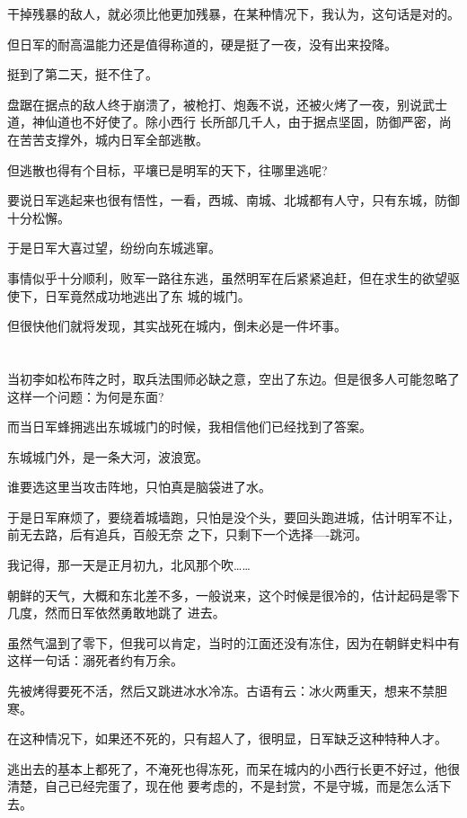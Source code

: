 \documentclass[11pt,a4paper,onecolumn]{article}
\begin{document}
干掉残暴的敌人，就必须比他更加残暴，在某种情况下，我认为，这句话是对的。

但日军的耐高温能力还是值得称道的，硬是挺了一夜，没有出来投降。

挺到了第二天，挺不住了。

盘踞在据点的敌人终于崩溃了，被枪打、炮轰不说，还被火烤了一夜，别说武士道，神仙道也不好使了。除小西行
长所部几千人，由于据点坚固，防御严密，尚在苦苦支撑外，城内日军全部逃散。

但逃散也得有个目标，平壤已是明军的天下，往哪里逃呢?

要说日军逃起来也很有悟性，一看，西城、南城、北城都有人守，只有东城，防御十分松懈。

于是日军大喜过望，纷纷向东城逃窜。

事情似乎十分顺利，败军一路往东逃，虽然明军在后紧紧追赶，但在求生的欲望驱使下，日军竟然成功地逃出了东
城的城门。

但很快他们就将发现，其实战死在城内，倒未必是一件坏事。

\section[\thesection]{}

当初李如松布阵之时，取兵法围师必缺之意，空出了东边。但是很多人可能忽略了这样一个问题：为何是东面?

而当日军蜂拥逃出东城城门的时候，我相信他们已经找到了答案。

东城城门外，是一条大河，波浪宽。

谁要选这里当攻击阵地，只怕真是脑袋进了水。

于是日军麻烦了，要绕着城墙跑，只怕是没个头，要回头跑进城，估计明军不让，前无去路，后有追兵，百般无奈
之下，只剩下一个选择----跳河。

我记得，那一天是正月初九，北风那个吹……

朝鲜的天气，大概和东北差不多，一般说来，这个时候是很冷的，估计起码是零下几度，然而日军依然勇敢地跳了
进去。

虽然气温到了零下，但我可以肯定，当时的江面还没有冻住，因为在朝鲜史料中有这样一句话：溺死者约有万余。

先被烤得要死不活，然后又跳进冰水冷冻。古语有云：冰火两重天，想来不禁胆寒。

在这种情况下，如果还不死的，只有超人了，很明显，日军缺乏这种特种人才。

逃出去的基本上都死了，不淹死也得冻死，而呆在城内的小西行长更不好过，他很清楚，自己已经完蛋了，现在他
要考虑的，不是封赏，不是守城，而是怎么活下去。
\end{document}
